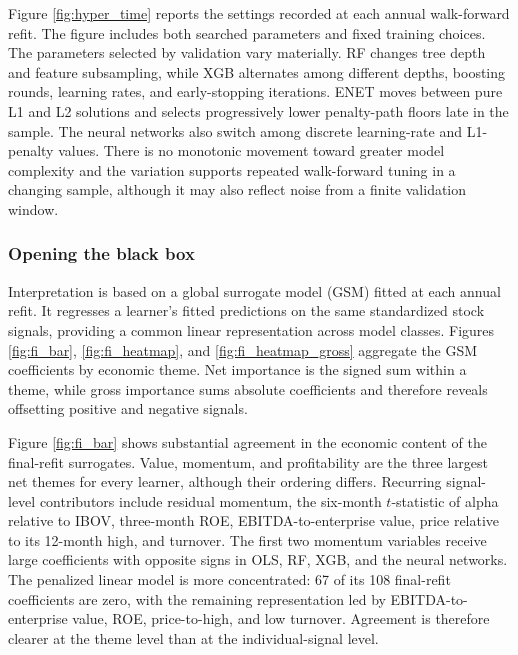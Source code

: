 \documentclass[preprint,12pt,authoryear]{elsarticle}
\begin{document}
Figure \ref{fig:hyper_time} reports the settings recorded at each annual walk-forward refit. The figure includes both searched parameters and fixed training choices.
The parameters selected by validation vary materially. RF changes tree depth and feature subsampling, while XGB alternates among different depths, boosting rounds, learning rates, and early-stopping iterations. ENET moves between pure L1 and L2 solutions and selects progressively lower penalty-path floors late in the sample. The neural networks also switch among discrete learning-rate and L1-penalty values. There is no monotonic movement toward greater model complexity and the variation supports repeated walk-forward tuning in a changing sample, although it may also reflect noise from a finite validation window.

\subsubsection{Opening the black box}

Interpretation is based on a global surrogate model (GSM) fitted at each annual refit. It regresses a learner's fitted predictions on the same standardized stock signals, providing a common linear representation across model classes. Figures \ref{fig:fi_bar}, \ref{fig:fi_heatmap}, and \ref{fig:fi_heatmap_gross} aggregate the GSM coefficients by economic theme. Net importance is the signed sum within a theme, while gross importance sums absolute coefficients and therefore reveals offsetting positive and negative signals.

Figure \ref{fig:fi_bar} shows substantial agreement in the economic content of the final-refit surrogates. Value, momentum, and profitability are the three largest net themes for every learner, although their ordering differs. Recurring signal-level contributors include residual momentum, the six-month $t$-statistic of alpha relative to IBOV, three-month ROE, EBITDA-to-enterprise value, price relative to its 12-month high, and turnover. The first two momentum variables receive large coefficients with opposite signs in OLS, RF, XGB, and the neural networks. The penalized linear model is more concentrated: 67 of its 108 final-refit coefficients are zero, with the remaining representation led by EBITDA-to-enterprise value, ROE, price-to-high, and low turnover. Agreement is therefore clearer at the theme level than at the individual-signal level.
\end{document}
